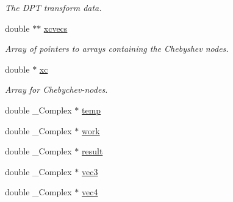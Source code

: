 \begin{CompactItemize}
\begin{CompactList}\small\item\em The DPT transform data. \item\end{CompactList}\item 
\hypertarget{structfpt__set__s_2775cb8a0a1f0b45114bdf9b4976d118}{
double $\ast$$\ast$ \hyperlink{structfpt__set__s_2775cb8a0a1f0b45114bdf9b4976d118}{xcvecs}}
\label{structfpt__set__s_2775cb8a0a1f0b45114bdf9b4976d118}

\begin{CompactList}\small\item\em Array of pointers to arrays containing the Chebyshev nodes. \item\end{CompactList}\item 
double $\ast$ \hyperlink{structfpt__set__s_b84648e5abdffa255d8b77e4fb19a3c4}{xc}
\begin{CompactList}\small\item\em Array for Chebychev-nodes. \item\end{CompactList}\item 
\hypertarget{structfpt__set__s_58270153ad4019aa255d97b2bf66ff87}{
double \_\-Complex $\ast$ \hyperlink{structfpt__set__s_58270153ad4019aa255d97b2bf66ff87}{temp}}
\label{structfpt__set__s_58270153ad4019aa255d97b2bf66ff87}

\item 
\hypertarget{structfpt__set__s_4606aac141a1340ce6524388c7475883}{
double \_\-Complex $\ast$ \hyperlink{structfpt__set__s_4606aac141a1340ce6524388c7475883}{work}}
\label{structfpt__set__s_4606aac141a1340ce6524388c7475883}

\item 
\hypertarget{structfpt__set__s_b73d28aa9069e71d759a9cd601b6f303}{
double \_\-Complex $\ast$ \hyperlink{structfpt__set__s_b73d28aa9069e71d759a9cd601b6f303}{result}}
\label{structfpt__set__s_b73d28aa9069e71d759a9cd601b6f303}

\item 
\hypertarget{structfpt__set__s_1fa99510092110f3e93bb7cf344f1dc7}{
double \_\-Complex $\ast$ \hyperlink{structfpt__set__s_1fa99510092110f3e93bb7cf344f1dc7}{vec3}}
\label{structfpt__set__s_1fa99510092110f3e93bb7cf344f1dc7}

\item 
\hypertarget{structfpt__set__s_e54438879d73c9f8810028d5fd34feeb}{
double \_\-Complex $\ast$ \hyperlink{structfpt__set__s_e54438879d73c9f8810028d5fd34feeb}{vec4}}
\label{structfpt__set__s_e54438879d73c9f8810028d5fd34feeb}


\end{CompactItemize}
